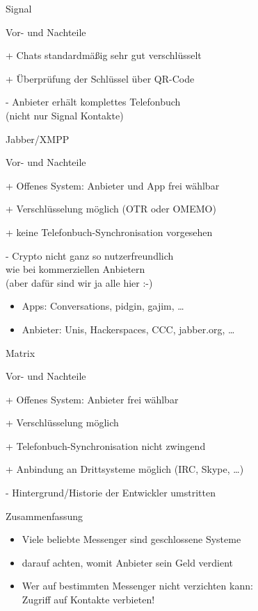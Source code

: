 \begin{frame}{Signal}
\begin{blex}{Vor- und Nachteile}
\item[+] Chats standardmäßig sehr gut verschlüsselt
\item[+] Überprüfung der Schlüssel über QR-Code
\item[-] Anbieter erhält komplettes Telefonbuch\\ (nicht nur Signal Kontakte)
\end{blex}
\end{frame}

\begin{frame}{Jabber/XMPP}
\begin{blex}{Vor- und Nachteile}
\item[+] Offenes System: Anbieter und App frei wählbar
\item[+] Verschlüsselung möglich (OTR oder OMEMO)
\item[+] keine Telefonbuch-Synchronisation vorgesehen
\item[-] Crypto nicht ganz so nutzerfreundlich\\wie bei kommerziellen Anbietern\\(aber dafür sind wir ja alle hier :-)
\end{blex}
\begin{itemize}
  \item    Apps: Conversations, pidgin, gajim, \ldots
  \item    Anbieter: Unis, Hackerspaces, CCC, jabber.org, \ldots
\end{itemize}
\end{frame}

\begin{frame}{Matrix}
\begin{blex}{Vor- und Nachteile}
\item[+] Offenes System: Anbieter frei wählbar
\item[+] Verschlüsselung möglich
\item[+] Telefonbuch-Synchronisation nicht zwingend
\item[+] Anbindung an Drittsysteme möglich (IRC, Skype, \ldots)
\item[-] Hintergrund/Historie der Entwickler umstritten
\end{blex}
\end{frame}

\begin{frame}{Zusammenfassung}
  \begin{itemize}
    \item Viele beliebte Messenger sind geschlossene Systeme
    \item darauf achten, womit Anbieter sein Geld verdient
    \item Wer auf bestimmten Messenger nicht verzichten kann:\\Zugriff auf Kontakte verbieten!
  \end{itemize}
\end{frame}

